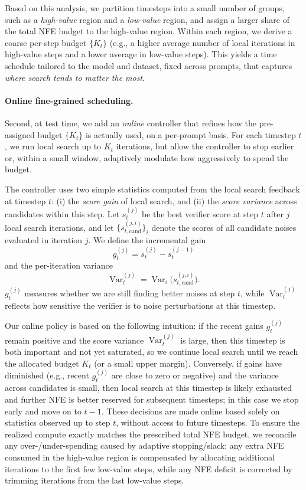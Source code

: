 Based on this analysis, we partition timesteps into a small number of groups,
such as a \emph{high-value} region and a \emph{low-value} region, and assign a
larger share of the total NFE budget to the high-value region.
Within each region, we derive a coarse per-step budget $\{K_t\}$ (e.g., a
higher average number of local iterations in high-value steps and a lower
average in low-value steps).
This yields a time schedule tailored to the model and dataset, fixed across
prompts, that captures \emph{where search tends to matter the most}.

\paragraph{Online fine-grained scheduling.}
Second, at test time, we add an \emph{online} controller that refines how the
pre-assigned budget $\{K_t\}$ is actually used, on a per-prompt basis.
For each timestep $t$, we run local search up to $K_t$ iterations, but allow the
controller to stop earlier or, within a small window, adaptively modulate how
aggressively to spend the budget.

The controller uses two simple statistics computed from the local search
feedback at timestep $t$:
(i) the \emph{score gain} of local search, and
(ii) the \emph{score variance} across candidates within this step.
Let $s_t^{(j)}$ be the best verifier score at step $t$ after $j$ local search
iterations, and let $\{s_{t,\text{cand}}^{(j,i)}\}_i$ denote the scores of all
candidate noises evaluated in iteration $j$.
We define the incremental gain
\[
  g_t^{(j)} = s_t^{(j)} - s_t^{(j-1)}
\]
and the per-iteration variance
\[
  \operatorname{Var}_t^{(j)} = \operatorname{Var}_i\bigl(s_{t,\text{cand}}^{(j,i)}\bigr).
\]
$g_t^{(j)}$ measures whether we are still finding
better noises at step $t$, while $\operatorname{Var}_t^{(j)}$ reflects how
sensitive the verifier is to noise perturbations at this timestep.

Our online policy is based on the following intuition:
if the recent gains $g_t^{(j)}$ remain positive and the score variance
$\operatorname{Var}_t^{(j)}$ is large, then this timestep is both important
and not yet saturated, so we continue local search until we reach the allocated
budget $K_t$ (or a small upper margin).
Conversely, if gains have diminished (e.g., recent $g_t^{(j)}$ are close to
zero or negative) and the variance across candidates is small, then local
search at this timestep is likely exhausted and further NFE is better reserved
for subsequent timesteps; in this case we stop early and move on to $t-1$.
These decisions are made online based solely on statistics observed up to step
$t$, without access to future timesteps. To ensure the realized compute exactly matches the prescribed total NFE budget,
we reconcile any over-/under-spending caused by adaptive stopping/slack:
any extra NFE consumed in the high-value region is compensated by allocating
additional iterations to the first few low-value steps, while any NFE deficit
is corrected by trimming iterations from the last low-value steps.

